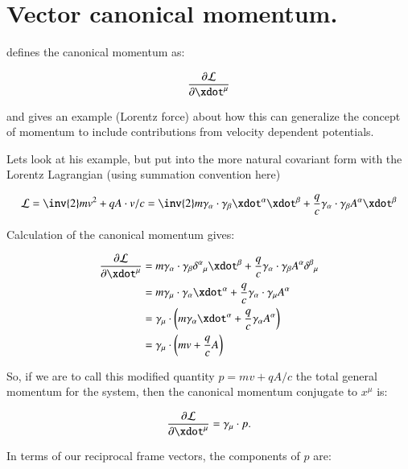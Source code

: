 \chapter{Vector canonical momentum.}\label{chap:PJCanMomentum}

\cite{goldstein1951cm} defines the canonical momentum as:

\begin{equation*}
\PD{\xdot^{\mu}}{\LL}
\end{equation*}

and gives an example (Lorentz force) about how this can generalize the
concept of momentum to include contributions from velocity dependent 
potentials.

Lets look at his example, but put into the more natural covariant form
with the Lorentz Lagrangian (using summation convention here)

\begin{equation*}
\LL = \inv{2} m v^2 + q A \cdot v /c = 
\inv{2} m \gamma_{\alpha} \cdot \gamma_{\beta} \xdot^{\alpha} \xdot^{\beta}
+ \frac{q}{c} \gamma_{\alpha} \cdot \gamma_{\beta} A^{\alpha} \xdot^{\beta}
\end{equation*}

Calculation of the canonical momentum gives:

\begin{align*}
\PD{\xdot^{\mu}}{\LL} 
&=
m \gamma_{\alpha} \cdot \gamma_{\beta} {\delta^{\alpha}}_{\mu} \xdot^{\beta}
+ \frac{q}{c} \gamma_{\alpha} \cdot \gamma_{\beta} A^{\alpha} {\delta^{\beta}}_{\mu} \\
&=
m \gamma_{\mu} \cdot \gamma_{\alpha} \xdot^{\alpha}
+ \frac{q}{c} \gamma_{\alpha} \cdot \gamma_{\mu} A^{\alpha} \\
&=
\gamma_{\mu} \cdot \left( 
m \gamma_{\alpha} \xdot^{\alpha}
+ \frac{q}{c} \gamma_{\alpha} A^{\alpha}
\right) \\
&= \gamma_{\mu} \cdot \left( m v + \frac{q}{c} A \right) \\
\end{align*}

So, if we are to call this modified quantity $p = m v + q A / c$ the total general momentum for the system, then the canonical momentum conjugate to $x^{\mu}$ is:

\begin{equation*}
\PD{\xdot^{\mu}}{\LL} = \gamma_{\mu} \cdot p.
\end{equation*}

In terms of our reciprocal frame vectors, the components of $p$ are:


